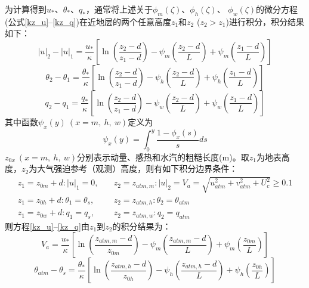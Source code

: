 为计算得到$u_\ast$、$\theta_\ast$、$q_\ast$，通常将上述关于$\phi_m\left(\zeta\right)$、$\phi_h\left(\zeta\right)$、
$\phi_w(\zeta)$的微分方程(公式\eqref{kz_u}--\eqref{kz_q})在近地层的两个任意高度$z_1$和$z_2$ ($z_2>z_1$)进行积分，积分结果如下：
\begin{equation}
|u|_{2}-|u|_{1}=\frac{u_{*}}{\kappa}\left[\ln \left(\frac{z_{2}-d}{z_{1}-d}\right)-\psi_{m}\left(\frac{z_{2}-d}{L}\right)+\psi_{m}\left(\frac{z_{1}-d}{L}\right)\right]
\end{equation}
%
\begin{equation}
\theta_{2}-\theta_{1}=\frac{\theta_{*}}{\kappa}\left[\ln \left(\frac{z_{2}-d}{z_{1}-d}\right)-\psi_{h}\left(\frac{z_{2}-d}{L}\right)+\psi_{h}\left(\frac{z_{1}-d}{L}\right)\right]
\end{equation}
%
\begin{equation}
q_{2}-q_{1}=\frac{q_{*}}{\kappa}\left[\ln \left(\frac{z_{2}-d}{z_{1}-d}\right)-\psi_{w}\left(\frac{z_{2}-d}{L}\right)+\psi_{w}\left(\frac{z_{1}-d}{L}\right)\right]
\end{equation}
其中函数$\psi_x\left(y\right)\ (x=m,\ h,\ w)$定义为
\begin{equation}
\psi_{x}(y)=\int_{0}^{y} \frac{1-\phi_{x}(s)}{s} d s
\end{equation}
$z_{0x}\ (x=m,\ h,\ w)$分别表示动量、感热和水汽的粗糙长度(m)。取$z_1$为地表高度，$z_2$为大气强迫参考（观测）高度，则有如下积分边界条件：
\begin{equation}\label{VaIni}
\begin{array}{ll}z_{1}=z_{0 m}+d:|u|_{1}=0, \quad & z_{2}=z_{atm, m}: |u|_{2}=V_{a}=\sqrt{u_{atm}^{2}+v_{atm}^{2}+U_{c}^{2}} \geq 0.1 \\ 
     z_{1}=z_{0 h}+d: \theta_{1}=\theta_{s}, & z_{2}=z_{atm, h}: \theta_{2}=\theta_{atm} \\ 
     z_{1}=z_{0 w}+d: q_{1}=q_{s}, & z_{2}=z_{atm, w}: q_{2}=q_{atm}\end{array}
\end{equation}
则方程\eqref{kz_u}--\eqref{kz_q}由$z_1$到$z_2$的积分结果为：
\begin{equation}\label{Va}
V_{a}=\frac{u_{*}}{\kappa}\left[\ln \left(\frac{z_{atm, m}-d}{z_{0 m}}\right)-\psi_{m}\left(\frac{z_{atm, m}-d}{L}\right)+\psi_{m}\left(\frac{z_{0 m}}{L}\right)\right]
\end{equation}
%
\begin{equation}\label{theta_atm-theta_s}
\theta_{atm}-\theta_{s}=\frac{\theta_{*}}{\kappa}\left[\ln \left(\frac{z_{atm, h}-d}{z_{0 h}}\right)-\psi_{h}\left(\frac{z_{atm, h}-d}{L}\right)+\psi_{h}\left(\frac{z_{0 h}}{L}\right)\right]
\end{equation}
